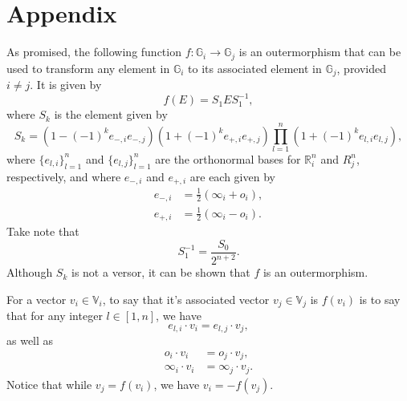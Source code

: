 \documentclass{ecgd-l}
\numberwithin{equation}{section}
\newcommand{\R}{\mathbb{R}}
\newcommand{\G}{\mathbb{G}}
\newcommand{\V}{\mathbb{V}}
\newcommand{\nvai}{\infty}
\newcommand{\nvao}{o}
\begin{document}
\section{Appendix}

As promised, the following function $f:\G_i\to\G_j$ is an outermorphism that can be used
to transform any element in $\G_i$ to its associated element in $\G_j$, provided $i\neq j$.
It is given by
\begin{equation*}
f(E) = S_1ES_1^{-1},
\end{equation*}
where $S_k$ is the element given by
\begin{equation*}
S_k = (1-(-1)^k e_{-,i}e_{-,j})(1+(-1)^k e_{+,i}e_{+,j})\prod_{l=1}^n(1+(-1)^k e_{l,i}e_{l,j}),
\end{equation*}
where $\{e_{l,i}\}_{l=1}^n$ and $\{e_{l,j}\}_{l=1}^n$ are the orthonormal bases for $\R_i^n$ and $R_j^n$, respectively,
and where $e_{-,i}$ and $e_{+,i}$ are each given by
\begin{align*}
e_{-,i} &= \frac{1}{2}(\nvai_i+\nvao_i),\\
e_{+,i} &= \frac{1}{2}(\nvai_i-\nvao_i).
\end{align*}
Take note that
\begin{equation*}
S_1^{-1} = \frac{S_0}{2^{n+2}}.
\end{equation*}
Although $S_k$ is not a versor, it can be shown that $f$ is an outermorphism.

For a vector $v_i\in\V_i$, to say that it's associated vector $v_j\in\V_j$ is $f(v_i)$ is to say
that for any integer $l\in[1,n]$, we have
\begin{equation*}
e_{l,i}\cdot v_i = e_{l,j}\cdot v_j,
\end{equation*}
as well as
\begin{align*}
\nvao_i\cdot v_i &= \nvao_j\cdot v_j,\\
\nvai_i\cdot v_i &= \nvai_j\cdot v_j.
\end{align*}
Notice that while $v_j=f(v_i)$, we have $v_i = -f(v_j)$.

\nocite{Milne12}


\end{document}

